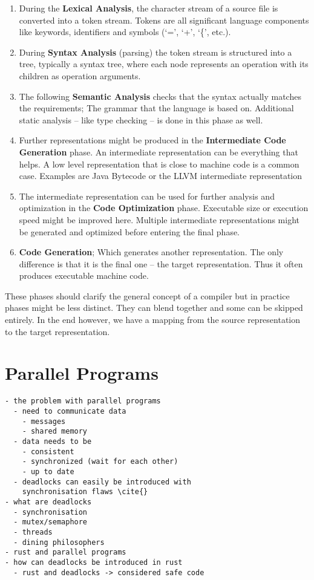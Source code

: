 \begin{enumerate}
  \item During the \textbf{Lexical Analysis}, the character stream of a source file is converted into a token stream.
  Tokens are all significant language components like keywords, identifiers and symbols (`=', `+', `\{', etc.).
  \item During \textbf{Syntax Analysis} (parsing) the token stream is structured into a tree,
  typically a syntax tree, where each node represents an operation with its children as operation arguments.
  \item The following \textbf{Semantic Analysis} checks that the syntax actually matches the requirements;
  The grammar that the language is based on.\newline
  Additional static analysis -- like type checking -- is done in this phase as well.
  \item Further representations might be produced in the \textbf{Intermediate Code Generation} phase.
  An intermediate representation can be everything that helps.
  A low level representation that is close to machine code is a common case.
  Examples are Java Bytecode or the LLVM intermediate representation
  \item The intermediate representation can be used for further analysis and optimization in the \textbf{Code Optimization} phase.
  Executable size or execution speed might be improved here.
  Multiple intermediate representations might be generated and optimized before entering the final phase.
  \item \textbf{Code Generation};
  Which generates another representation.
  The only difference is that it is the final one -- the target representation.
  Thus it often produces executable machine code.
\end{enumerate}

These phases should clarify the general concept of a compiler but in practice phases might be less distinct.
They can blend together and some can be skipped entirely.
In the end however, we have a mapping from the source representation to the target representation.

\section{Parallel Programs}
\label{rel_para}
\begin{verbatim}
- the problem with parallel programs
  - need to communicate data
    - messages
    - shared memory
  - data needs to be 
    - consistent 
    - synchronized (wait for each other)
    - up to date
  - deadlocks can easily be introduced with 
    synchronisation flaws \cite{}
- what are deadlocks
  - synchronisation
  - mutex/semaphore
  - threads
  - dining philosophers
- rust and parallel programs
- how can deadlocks be introduced in rust
  - rust and deadlocks -> considered safe code
\end{verbatim}

